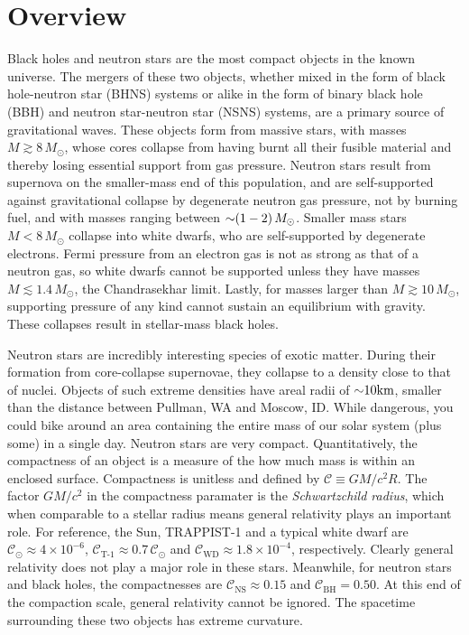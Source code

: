\chapter{Overview}
\label{chap:chapter-1}


Black holes and neutron stars are the most compact objects in the known universe.  
The mergers of these two objects,
 whether mixed in the form of black hole-neutron star (BHNS) systems or alike in the form of binary black hole (BBH) and neutron star-neutron star (NSNS) systems,
 are a primary source of gravitational waves.  
These objects form from massive stars,
 with masses $M\gtrsim 8\,M_{\odot}$,
 whose cores collapse from having burnt all their fusible material and thereby
 losing essential support from gas pressure.
Neutron stars result from supernova on the smaller-mass end of this population,
 and are self-supported against gravitational collapse by degenerate neutron gas pressure,
 not by burning fuel,
 and with masses ranging between $\mathord{\sim} (1-2)\,M_{\odot}$.
Smaller mass stars $M < 8\, M_\odot$ collapse into white dwarfs,
 who are self-supported by degenerate electrons.  
Fermi pressure from an electron gas is not as strong as that of a neutron gas,
 so white dwarfs cannot be supported unless they have masses $M\lesssim 1.4\,M_{\odot}$,
 the Chandrasekhar limit.  
Lastly, for masses larger than $M\gtrsim 10\,M_{\odot}$,
 supporting pressure of any kind cannot sustain an equilibrium with gravity.  
These collapses result in stellar-mass black holes.

Neutron stars are incredibly interesting species of exotic matter. 
During their formation from core-collapse supernovae,
 they collapse to a density close to that of nuclei.
Objects of such extreme densities have areal radii of $\mathord{\sim} 10 \textrm{km}$,
 smaller than the distance between Pullman, WA and Moscow, ID.
While dangerous, 
 you could bike around an area containing the entire mass of our solar system (plus some) in a single day.
Neutron stars are very compact.
Quantitatively, the compactness of an object is a measure of the how much mass is within an enclosed surface.
Compactness is unitless and defined by $\mathcal{C}\equiv G M/c^2 R$.
The factor $G M/c^2$ in the compactness paramater is the \textit{Schwartzchild radius},
 which when comparable to a stellar radius means general relativity plays an important role.
For reference,
 the Sun, TRAPPIST-1 and a typical white dwarf are
 $\mathcal{C}_{\odot} \approx 4 \times 10^{-6}$,
 $\mathcal{C}_\textrm{T-1} \approx 0.7\,\mathcal{C}_{\odot}$
 and
 $\mathcal{C}_\textrm{WD} \approx 1.8 \times 10^{-4}$,
 respectively.
Clearly general relativity does not play a major role in these stars.
Meanwhile, for neutron stars and black holes, the compactnesses are 
 $\mathcal{C}_\textrm{NS} \approx 0.15$
 and
 $\mathcal{C}_\textrm{BH} = 0.50$.
At this end of the compaction scale, general relativity cannot be ignored.  The spacetime surrounding these two objects has extreme curvature.

